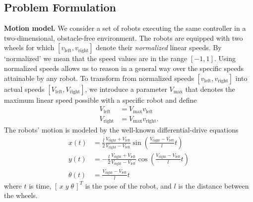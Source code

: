 \documentclass[letterpaper, 10 pt, conference]{ieeeconf}
\newcommand{\myparagraph}[1]{\textbf{#1.}}
\begin{document}
\subsection{Problem Formulation}

\newcommand{\vL}{\ensuremath{v_{\text{left}}}}
\newcommand{\vR}{\ensuremath{v_{\text{right}}}}
\newcommand{\vaL}{\ensuremath{V_{\text{left}}}}
\newcommand{\vaR}{\ensuremath{V_{\text{right}}}}
\newcommand{\VM}{\ensuremath{V_{\text{max}}}}
\myparagraph{Motion model}
We consider a set of robots executing the same controller in a two-dimensional,
obstacle-free environment. The robots are equipped with two wheels for which
$[\vL,\vR]$ denote their \emph{normalized} linear speeds. By `normalized' we
mean that the speed values are in the range $[-1, 1]$. Using normalized speeds
allows us to reason in a general way over the specific speeds attainable by any
robot. To transform from normalized speeds $[\vL,\vR]$ into actual speeds
$[\vaL,\vaR]$, we introduce a parameter $\VM$ that denotes the maximum linear
speed possible with a specific robot and define
\begin{align}
  \vaL &= \VM \vL\\
  \vaR &= \VM \vR.
\end{align}
The robots' motion is modeled by the well-known differential-drive
equations~\cite{Dudek2010}
\begin{equation}
  \label{eq:diffdrive}
  \begin{aligned}
    x(t)      &=  \frac{l}{2}\frac{\vaR+\vaL}{\vaR-\vaL}\sin\left(\frac{\vaR-\vaL}{l}t\right)\\
    y(t)      &= -\frac{l}{2}\frac{\vaR+\vaL}{\vaR-\vaL}\cos\left(\frac{\vaR-\vaL}{l}t\right)\\
    \theta(t) &=  \frac{\vaR-\vaL}{l}t
  \end{aligned}
\end{equation}
where $t$ is time, $[\,x\;y\;\theta\,]^T$ is the pose of the robot, and $l$ is
the distance between the wheels.
\end{document}
